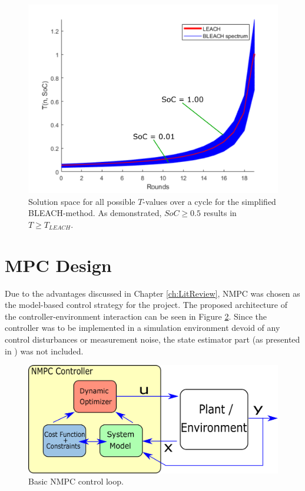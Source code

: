 \begin{figure}
    \centering
    \includegraphics[scale=0.3]{Images/oBLEACH.png}
    \caption{Solution space for all possible $T$-values over a cycle for the simplified BLEACH-method. As demonstrated, $SoC\geq 0.5$ results in $T\geq T_{LEACH}$.}
    \label{fig:oBLEACH}
\end{figure}


\section{MPC Design}
Due to the advantages discussed in Chapter \ref{ch:LitReview}, NMPC was chosen as the model-based control strategy for the project. The proposed architecture of the controller-environment interaction can be seen in Figure \ref{fig:NMPCarchi}. Since the controller was to be implemented in a simulation environment devoid of any control disturbances or measurement noise, the state estimator part (as presented in \cite{findeisen2002introduction}) was not included.
\begin{figure}
    \centering
    \includegraphics[scale=0.2]{Images/NMPCcontr.png}
    \caption{Basic NMPC control loop.}
    \label{fig:NMPCarchi}
\end{figure}

